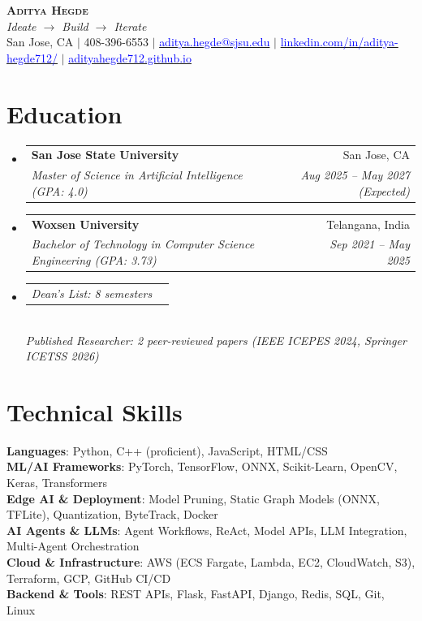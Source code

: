 \documentclass[letterpaper,11pt]{article}
\makeatletter
\newcommand{\resumeSubheading}[4]{
  \vspace{-2pt}\item
    \begin{tabular*}{0.97\textwidth}[t]{l@{\extracolsep{\fill}}r}
      \textbf{#1} & #2 \\
      \textit{\small#3} & \textit{\small #4} \\
    \end{tabular*}\vspace{-7pt}
}
\newcommand{\resumeSubSubheading}[2]{
    \vspace{-2pt}\item
    \begin{tabular*}{0.97\textwidth}{l@{\extracolsep{\fill}}r}
      \textit{\small#1} & \textit{\small #2} \\
    \end{tabular*}\vspace{-6pt}
}
\newcommand{\resumeSubHeadingListStart}{\begin{itemize}[leftmargin=0.15in, label={}]}
\newcommand{\resumeSubHeadingListEnd}{\end{itemize}}
\makeatother
\begin{document}
\textcolor{blue}{\tiny }
\begin{center}
    \vspace{-35pt}
    \textbf{\Huge \scshape Aditya Hegde} \\ \vspace{1pt}
    {\small \textit{Ideate $\rightarrow$ Build $\rightarrow$ Iterate}} \\ \vspace{2pt}
    \small San Jose, CA 
    $|$ 408-396-6553 
    $|$ \href{mailto:x@x.com}{\textcolor{blue}{aditya.hegde@sjsu.edu}} 
    $|$ \href{https://www.linkedin.com/in/aditya-hegde712} {\textcolor{blue}{linkedin.com/in/aditya-hegde712/}}
    $|$ \href{https://adityahegde712.github.io/}{\textcolor{blue}{adityahegde712.github.io}}
\end{center}

\section{\textbf{Education}}
  \resumeSubHeadingListStart
    \resumeSubheading
      {San Jose State University}{San Jose, CA}
      {Master of Science in Artificial Intelligence (GPA: 4.0)}{Aug 2025 -- May 2027 (Expected)}
    \vspace{-3pt}
    \resumeSubheading
      {Woxsen University}{Telangana, India}
      {Bachelor of Technology in Computer Science Engineering (GPA: 3.73)}{Sep 2021 -- May 2025}
      \vspace{-8pt}
      \resumeSubSubheading
      {Dean's List: 8 semesters}{}\\
      \vspace{2pt}
      \textit{\small Published Researcher: 2 peer-reviewed papers (IEEE ICEPES 2024, Springer ICETSS 2026)}
  \resumeSubHeadingListEnd

\section{\textbf{Technical Skills}}
 \begin{itemize}[leftmargin=0.15in, label={}]
    \small{\item{
     \textbf{Languages}{: Python, C++ (proficient), JavaScript, HTML/CSS} \\
     \textbf{ML/AI Frameworks}{: PyTorch, TensorFlow, ONNX, Scikit-Learn, OpenCV, Keras, Transformers} \\
     \textbf{Edge AI \& Deployment}{: Model Pruning, Static Graph Models (ONNX, TFLite), Quantization, ByteTrack, Docker}\\
     \textbf{AI Agents \& LLMs}{: Agent Workflows, ReAct, Model APIs, LLM Integration, Multi-Agent Orchestration}\\
     \textbf{Cloud \& Infrastructure}{: AWS (ECS Fargate, Lambda, EC2, CloudWatch, S3), Terraform, GCP, GitHub CI/CD}\\
     \textbf{Backend \& Tools}{: REST APIs, Flask, FastAPI, Django, Redis, SQL, Git, Linux}
    }}
 \end{itemize}
\end{document}
